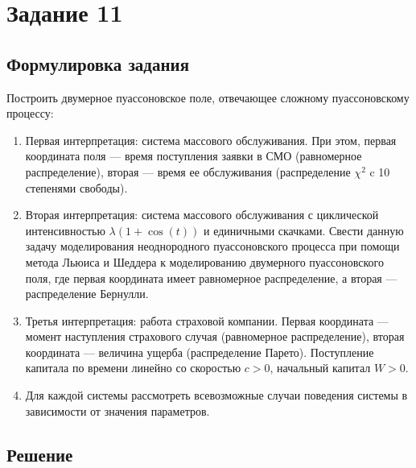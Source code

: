 \documentclass[11pt]{article}
\numberwithin{equation}{section}
\begin{document}
\section{Задание 11}
\subsection{Формулировка задания}
Построить двумерное пуассоновское поле, отвечающее сложному пуассоновскому процессу:
\begin{enumerate}
	\item Первая интерпретация: система массового обслуживания. При этом, первая координата поля --- время поступления заявки в СМО (равномерное распределение), вторая --- время ее обслуживания (распределение $\chi^2$ c 10 степенями свободы).
	\item Вторая интерпретация: система массового обслуживания с циклической интенсивностью $\lambda(1 + \cos(t))$ и единичными скачками. Свести данную задачу моделирования неоднородного пуассоновского процесса при помощи метода Льюиса и Шеддера к моделированию двумерного пуассоновского поля, где первая координата имеет равномерное распределение, а вторая --- распределение Бернулли.
	\item Третья интерпретация: работа страховой компании. Первая координата --- момент наступления страхового случая (равномерное распределение), вторая координата --- величина ущерба (распределение Парето). Поступление капитала по времени линейно со скоростью $c > 0$, начальный капитал $W > 0$.
	\item Для каждой системы  рассмотреть всевозможные случаи поведения системы в зависимости от значения параметров.
\end{enumerate}
\subsection{Решение}
\end{document}
